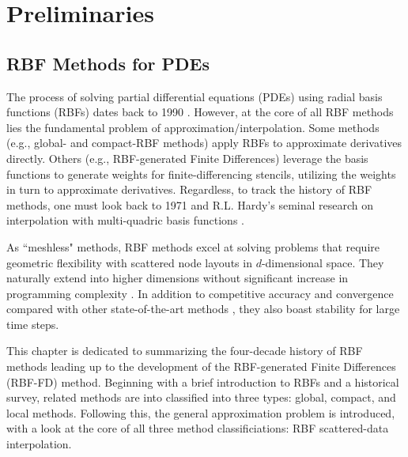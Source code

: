 \documentclass[11pt]{report}
\begin{document}
\tableofcontents
\fi

{ \graphicspath{{rbffd_methods_content/}} 

\part{Preliminaries}


\chapter{RBF Methods for PDEs}
\label{chap:background}

The process of solving partial differential equations (PDEs) using radial basis functions (RBFs) dates back to 1990 \cite{Kansa1990a,Kansa1990b}. However, at the core of all RBF methods lies the fundamental problem of approximation/interpolation. Some methods (e.g., global- and compact-RBF methods) apply RBFs to approximate derivatives directly. Others (e.g., RBF-generated Finite Differences) leverage the basis functions to generate weights for finite-differencing stencils, utilizing the weights in turn to approximate derivatives. Regardless, to track the history of RBF methods, one must look back to 1971 and R.L. Hardy's seminal research on interpolation with multi-quadric basis functions \cite{Hardy1971}. 

As ``meshless" methods, RBF methods excel at solving problems that require geometric flexibility with scattered node layouts in $d$-dimensional space. They naturally extend into higher dimensions without significant increase in programming complexity \cite{FlyerWright07,WrightFlyerYuen10}. In addition to competitive accuracy and convergence compared with other state-of-the-art methods \cite{FlyerWright07, FlyerWright09, FlyerLehto10, WrightFlyerYuen10, FlyerFornberg11}, they also boast stability for large time steps.


This chapter is dedicated to summarizing the four-decade history of RBF methods leading up to the development of the 
RBF-generated Finite Differences (RBF-FD) method. Beginning with a brief introduction to RBFs and a historical survey, related methods are into classified into three types: global, compact, and local methods. Following this, the general approximation problem is introduced, with a look at the core of all three method classificiations: RBF scattered-data interpolation. %


}
\end{document}
